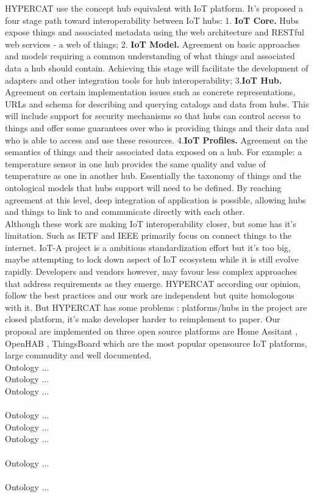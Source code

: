 \documentclass[runningheads,a4paper]{llncs}
\begin{document}
HYPERCAT use the concept hub equivalent with IoT platform. It's proposed a four stage path toward interoperability between IoT hubs: 1. \textbf{IoT Core.} Hubs expose things and associated metadata using the web architecture and RESTful web services - a web of things; 2.   \textbf{IoT Model.} Agreement on basic approaches and models requiring a common understanding of what things and  associated data a hub should contain. Achieving this stage will
facilitate the development of adapters and other integration tools for hub interoperability; 3.\textbf{IoT Hub.} Agreement on certain implementation issues such as concrete representations, URLs and schema for describing and querying catalogs and data from hubs. This will include support for security mechanisms so that hubs can control
access to things and offer some guarantees over who is providing things and their data and who is able to access and use these resources. 4.\textbf{IoT Profiles.} Agreement on the semantics of things and their associated data exposed on a hub. For example: a temperature sensor in one hub provides the same quality and value of temperature as one in another hub. Essentially the taxonomy of things and the ontological models that hubs support will need to be defined. By reaching agreement at this level, deep integration of application is possible, allowing hubs and things to link to and communicate directly with each other. \\

Although these work are making IoT interoperability closer, but some has it's limitation. Such as IETF and IEEE primarily focus on connect things to the internet. IoT-A project is a ambitious standardization effort but it's too big, maybe attempting to lock down aspect of IoT ecosystem while it is still evolve rapidly. Developers and vendors however, may favour less complex approaches that address requirements as they emerge. HYPERCAT according our opinion, follow the best practices and our work are independent but quite homologous with it. But HYPERCAT has some problems : platforms/hubs in the project are closed platform, it's make developer harder to reimplement to paper. Our proposal are implemented on three open source platforms are Home Assitant \cite{home-assistant}, OpenHAB \cite{openhab}, ThingsBoard \cite{thingsboard} which are the most popular opensource IoT platforms, large commudity and well documented. \\



Ontology ...\\
Ontology ...\\
Ontology ...\\\\
Ontology ...\\
Ontology ...\\
Ontology ...\\\\
Ontology ...\\\\
Ontology ...\\
\end{document}
